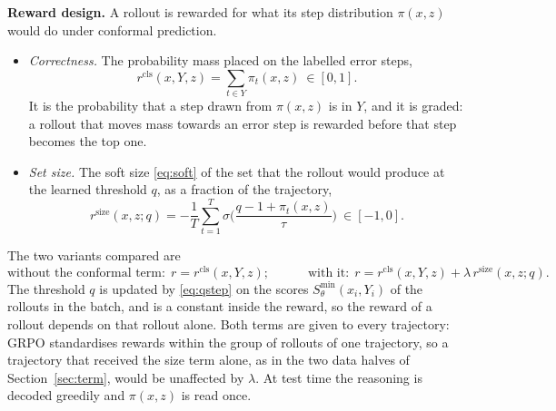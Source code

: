 \documentclass[10pt,a4paper]{article}
\newcommand{\Smin}{S^{\min}}
\begin{document}
\textbf{Reward design.} A rollout is rewarded for what its step distribution $\pi(x,z)$ would do under conformal prediction.
\begin{itemize}
\item \emph{Correctness.} The probability mass placed on the labelled error steps,
\begin{equation}
r^{\mathrm{cls}}(x,Y,z)=\sum_{t\in Y}\pi_t(x,z)\ \in[0,1]. \label{eq:rcls}
\end{equation}
It is the probability that a step drawn from $\pi(x,z)$ is in $Y$, and it is graded: a rollout that moves mass towards an error step is rewarded before that step becomes the top one.
\item \emph{Set size.} The soft size \eqref{eq:soft} of the set that the rollout would produce at the learned threshold $q$, as a fraction of the trajectory,
\begin{equation}
r^{\mathrm{size}}(x,z;q)=-\frac{1}{T}\sum_{t=1}^{T}\sigma\!\Big(\frac{q-1+\pi_t(x,z)}{\tau}\Big)\ \in[-1,0]. \label{eq:rsizellm}
\end{equation}
\end{itemize}
The two variants compared are
\begin{equation}
\text{without the conformal term:}\ \ r=r^{\mathrm{cls}}(x,Y,z);\qquad\quad \text{with it:}\ \ r=r^{\mathrm{cls}}(x,Y,z)+\lambda\,r^{\mathrm{size}}(x,z;q). \label{eq:rewards}
\end{equation}
The threshold $q$ is updated by \eqref{eq:qstep} on the scores $\Smin_\theta(x_i,Y_i)$ of the rollouts in the batch, and is a constant inside the reward, so the reward of a rollout depends on that rollout alone. Both terms are given to every trajectory: GRPO standardises rewards within the group of rollouts of one trajectory, so a trajectory that received the size term alone, as in the two data halves of Section~\ref{sec:term}, would be unaffected by $\lambda$. At test time the reasoning is decoded greedily and $\pi(x,z)$ is read once.
\end{document}
